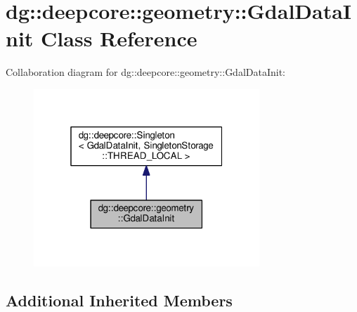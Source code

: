 \hypertarget{classdg_1_1deepcore_1_1geometry_1_1_gdal_data_init}{}\section{dg\+:\+:deepcore\+:\+:geometry\+:\+:Gdal\+Data\+Init Class Reference}
\label{classdg_1_1deepcore_1_1geometry_1_1_gdal_data_init}


Collaboration diagram for dg\+:\+:deepcore\+:\+:geometry\+:\+:Gdal\+Data\+Init\+:
\nopagebreak
\begin{figure}[H]
\begin{center}
\leavevmode
\includegraphics[width=241pt]{classdg_1_1deepcore_1_1geometry_1_1_gdal_data_init__coll__graph}
\end{center}
\end{figure}
\subsection*{Additional Inherited Members}
